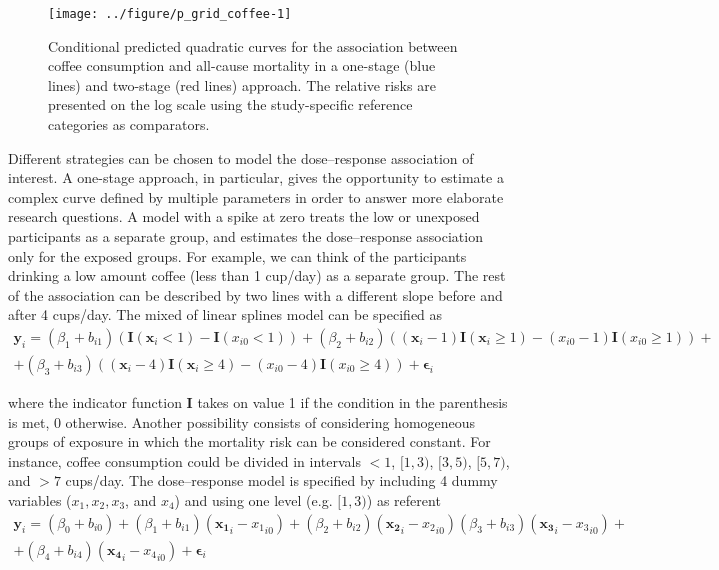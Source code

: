 \documentclass[11pt,a4paper,twoside,openany]{book}\usepackage{knitr}
\begin{document}
{{\begin{knitrout}
\begin{figure}[ht!]
{\centering \texttt{[image: ../figure/p\_grid\_coffee-1]} 

}

\caption[Conditional predicted quadratic curves for the association between coffee consumption and all-cause mortality in a one-stage (blue lines) and two-stage (red lines) approach]{Conditional predicted quadratic curves for the association between coffee consumption and all-cause mortality in a one-stage (blue lines) and two-stage (red lines) approach. The relative risks are presented on the log scale using the study-specific reference categories as comparators.}\label{fig:p_grid_coffee}
\end{figure}


\end{knitrout}



Different strategies can be chosen to model the dose--response association of interest. A one-stage approach, in particular, gives the opportunity to estimate a complex curve defined by multiple parameters in order to answer more elaborate research questions. A model with a spike at zero treats the low or unexposed participants as a separate group, and estimates the dose--response association only for the exposed groups. For example, we can think of the participants drinking a low amount coffee (less than 1 cup/day) as a separate group. The rest of the association can be described by two lines with a different slope before and after 4 cups/day. The mixed of linear splines model can be specified as
\begin{multline*}
\mathbf{y}_i = (\beta_1 + b_{i1}) \left( \mathbf{I}(\mathbf{x}_{i} < 1) - \mathbf{I}(x_{i0} < 1) \right) +(\beta_2  + b_{i2}) \left( (\mathbf{x}_{i} - 1)\mathbf{I}(\mathbf{x}_{i} \ge 1) - (x_{i0} - 1)\mathbf{I}(x_{i0} \ge 1) \right) + \\  +(\beta_3  + b_{i3}) \left( (\mathbf{x}_{i} - 4)\mathbf{I}(\mathbf{x}_{i} \ge 4) - (x_{i0} - 4)\mathbf{I}(x_{i0} \ge 4) \right) + \boldsymbol{\epsilon}_{i}
\label{spike_zero}
\end{multline*}

\noindent where the indicator function $\mathbf{I}$ takes on value 1 if the condition in the parenthesis  is met, 0 otherwise.
\noindent Another possibility consists of considering homogeneous groups of exposure in which the mortality risk can be considered constant. For instance, coffee consumption could be divided in intervals $< 1$, $[1, 3)$, $[3, 5)$, $[5, 7)$, and $> 7$ cups/day. The dose--response model is specified by including 4 dummy variables ($x_1, x_2, x_3$, and $x_4$) and using one level (e.g. $[1, 3)$) as referent
\begin{multline*}
\mathbf{y}_i =  (\beta_0 + b_{i0}) + (\beta_1 + b_{i1}) (\mathbf{x_1}_{i} - {x_1}_{i0}) + (\beta_2  + b_{i2}) (\mathbf{x_2}_{i} - {x_2}_{i0})
(\beta_3 + b_{i3}) (\mathbf{x_3}_{i} - {x_3}_{i0}) + \\  + (\beta_4 + b_{i4}) (\mathbf{x_4}_{i} - {x_4}_{i0}) + \boldsymbol{\epsilon}_{i}
\end{multline*}

}}
\end{document}
